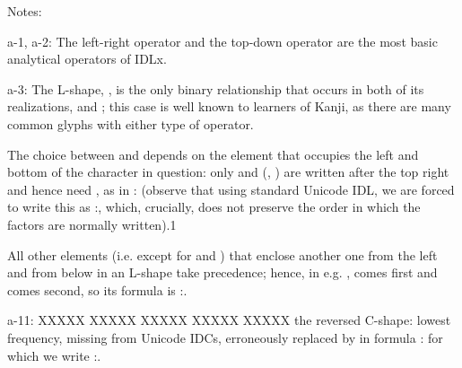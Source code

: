 \vspace{\myLineheight}\begin{multicols}{2}\raggedcolumns{}

{\mktsStyleItalic{}Notes\/}:

{\mktsStyleBold{}a-1}, {\mktsStyleBold{}a-2}: The left-right operator \cjkgGlue{} and the top-down operator \cjkgGlue{}
are the most basic analytical operators of IDLx.

{\mktsStyleBold{}a-3}: The L-shape, \cjkgGlue{}, is the only binary relationship that occurs in both of
its realizations, \cjkgGlue{} and \cjkgGlue{}; this case is well known to learners of Kanji, as
there are many common glyphs with either type of operator.

The choice between \cjkgGlue{} and \cjkgGlue{} depends on the element that occupies the left and bottom of the character in
question: only \cjkgGlue{} and \cjkgGlue{} (\cjkgGlue{}, \cjkgGlue{}) are written {\mktsStyleItalic{}after\/} the top right and hence
need \cjkgGlue{}, as in \cjkgGlue{}:\cjkgGlue{} (observe that using standard Unicode IDL, we are forced to write
this as
\cjkgGlue{}:\cjkgGlue{}\cjkgGlue{}, which,
crucially, does not preserve the order in which the factors are normally written).{\mktsEnStyleMarkMain{}1}

All other elements (i.e. except for \cjkgGlue{} and \cjkgGlue{}) that enclose another one from the left and
from below in an L-shape take precedence; hence, in e.g. \cjkgGlue{}, \cjkgGlue{} comes first and \cjkgGlue{}
comes second, so its formula is \cjkgGlue{}:\cjkgGlue{}\cjkgGlue{}.

{\mktsStyleBold{}a-11}: XXXXX XXXXX XXXXX XXXXX XXXXX the reversed C-shape: lowest frequency, missing from Unicode IDCs,
erroneously replaced by \cjkgGlue{} in formula
\cjkgGlue{}:\cjkgGlue{}\cjkgGlue{} for which we write \cjkgGlue{}:\cjkgGlue{}\cjkgGlue{}.


\end{multicols}
